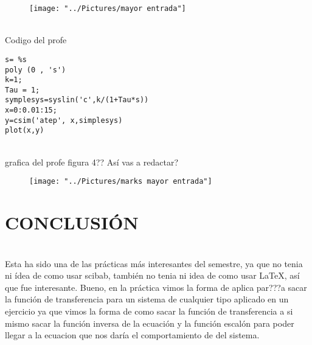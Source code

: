 \documentclass[12pt]{article}
\begin{document}
\begin{figure}[h]
\centering
\texttt{[image: "../Pictures/mayor entrada"]}
\caption{}
\label{fig:mayor-entrada}
\end{figure}
\\ Codigo del profe
\begin{lstlisting}
s= %s
poly (0 , 's')
k=1;
Tau = 1;
symplesys=syslin('c',k/(1+Tau*s))
x=0:0.01:15;
y=csim('atep', x,simplesys)
plot(x,y)
\end{lstlisting}

\\grafica del profe figura 4?? Así vas a redactar?
\begin{figure}[h]
\centering
\texttt{[image: "../Pictures/marks mayor entrada"]}
\caption{}
\label{fig:marks-mayor-entrada}
\end{figure}
\section{CONCLUSIÓN}

\\ Esta ha sido una de las prácticas más interesantes del semestre, ya que no tenia ni ídea de como usar scibab, también no tenia ni idea de como usar LaTeX, así que fue interesante. Bueno,  en la práctica vimos la forma de aplica par???a sacar la función de transferencia para un sistema de cualquier tipo aplicado en un ejercicio ya que vimos la forma de como sacar la función de transferencia a si mismo sacar la función inversa de la ecuación y la función escalón para poder llegar a la ecuacion que nos daría el comportamiento de del sistema.
\end{document}
